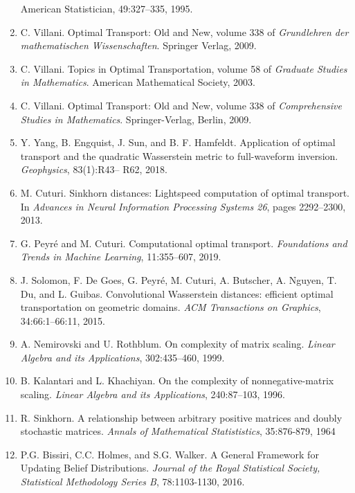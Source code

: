 \documentclass[botnum, fleqn]{unmeethesis}
\begin{document}
\begin{enumerate}
	American Statistician, 49:327–335, 1995.
	\item C. Villani. Optimal Transport: Old and New, volume 338 of \emph{Grundlehren der mathematischen
	Wissenschaften}. Springer Verlag, 2009.
    \item C. Villani. Topics in Optimal Transportation, volume 58 of \emph{Graduate Studies in Mathematics}.
    American Mathematical Society, 2003.
    \item C. Villani. Optimal Transport: Old and New, volume 338 of \emph{Comprehensive Studies in
    Mathematics}. Springer-Verlag, Berlin, 2009.
	\item Y. Yang, B. Engquist, J. Sun, and B. F. Hamfeldt. Application of optimal transport
	and the quadratic Wasserstein metric to full-waveform inversion. \emph{Geophysics}, 83(1):R43–
	R62, 2018.
	\item M. Cuturi. Sinkhorn distances: Lightspeed computation of optimal transport. In \emph{Advances
	in Neural Information Processing Systems 26}, pages 2292–2300, 2013.
	\item G. Peyré and M. Cuturi. Computational optimal transport. \emph{Foundations and Trends in
	Machine Learning}, 11:355–607, 2019.
	\item J. Solomon, F. De Goes, G. Peyré, M. Cuturi, A. Butscher, A. Nguyen, T. Du, and L. Guibas.
	Convolutional Wasserstein distances: efficient optimal transportation on geometric domains.
	\emph{ACM Transactions on Graphics}, 34:66:1–66:11, 2015.
	\item A. Nemirovski and U. Rothblum. On complexity of matrix scaling. \emph{Linear Algebra and its
	Applications}, 302:435–460, 1999.
	\item B. Kalantari and L. Khachiyan. On the complexity of nonnegative-matrix scaling. \emph{Linear
	Algebra and its Applications}, 240:87–103, 1996.
	\item R. Sinkhorn. A relationship between arbitrary positive matrices and doubly stochastic matrices. \emph{Annals of Mathematical Statististics}, 35:876-879, 1964
	\item P.G. Bissiri, C.C. Holmes, and S.G. Walker. A General Framework for Updating Belief Distributions. \emph{Journal of the Royal Statistical Society, Statistical Methodology Series B}, 78:1103-1130, 2016.
	
\end{enumerate}




%
%
\end{document}
